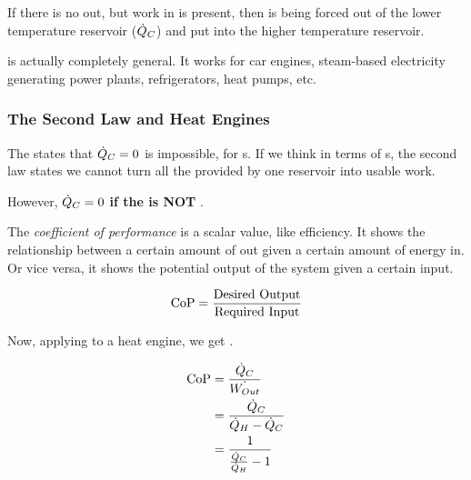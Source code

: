 If there is no  out, but work in is present, then  is being forced out of the lower temperature reservoir ($\dot{Q}_{C}$) and put into the higher temperature reservoir.

 is actually completely general.
It works for car engines, steam-based electricity generating power plants, refrigerators, heat pumps, etc.

\subsubsection{The Second Law and Heat Engines}\label{subsubsec:2nd_Law_Heat_Engines}
The  states that $\dot{Q}_{C} = 0$ is impossible, for s.
If we think in terms of s, the second law states we cannot turn all the  provided by one reservoir into usable work.

However, $\dot{Q}_{C} = 0$ \textbf{if the  is NOT }.

\begin{definition}\label{def:Coefficient_of_Performance}
  The \emph{coefficient of performance} is a scalar value, like efficiency.
  It shows the relationship between a certain amount of  out given a certain amount of energy in.
  Or vice versa, it shows the potential output of the system given a certain input.

  \begin{equation}\label{eq:Coefficient_of_Performance}
    \text{CoP} = \frac{\text{Desired Output}}{\text{Required Input}}
  \end{equation}
\end{definition}

Now, applying  to a heat engine, we get .

\begin{equation}\label{eq:Coefficient_of_Performance-Heat_Engine}
  \begin{aligned}
    \text{CoP} &= \frac{\dot{Q}_{C}}{\dot{W_{Out}}} \\
    &= \frac{\dot{Q}_{C}}{\dot{Q}_{H} - \dot{Q}_{C}} \\
    &= \frac{1}{\frac{\dot{Q}_{C}}{\dot{Q}_{H}} - 1}
  \end{aligned}
\end{equation}

